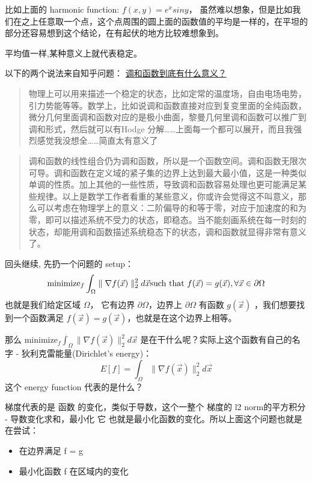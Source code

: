 \documentclass[
]{book}
\providecommand{\tightlist}{%
  \setlength{\itemsep}{0pt}\setlength{\parskip}{0pt}}
\begin{document}
比如上面的 harmonic function: \(f(x,y) = e^x siny\)， 虽然难以想象，但是比如我们在之上任意取一个点，这个点周围的圆上面的函数值的平均是一样的，在平坦的部分还容易想到这个结论，在有起伏的地方比较难想象到。

平均值一样,某种意义上就代表稳定。

以下的两个说法来自知乎问题： \href{https://www.zhihu.com/question/25083195}{调和函数到底有什么意义？}

\begin{quote}
物理上可以用来描述一个稳定的状态，比如定常的温度场，自由电场电势，引力势能等等。数学上，比如说调和函数直接对应到复变里面的全纯函数，微分几何里面调和函数对应的是极小曲面，黎曼几何里调和函数可以推广到调和形式，然后就可以有Hodge 分解\ldots\ldots 上面每一个都可以展开，而且我强烈感觉我没想全\ldots\ldots 简直太有意义了
\end{quote}

\begin{quote}
调和函数的线性组合仍为调和函数，所以是一个函数空间。调和函数无限次可导。调和函数在定义域的紧子集的边界上达到最大最小值，这是一种类似单调的性质。加上其他的一些性质，导致调和函数容易处理也更可能满足某些规律。以上是数学工作者看重的某些意义，你或许会觉得这不叫意义，那么可以考虑在物理学上的意义：二阶偏导的和等于零，对应于加速度的和为零，即可以描述系统不受力的状态，即稳态。当不能刻画系统在每一时刻的状态，却能用调和函数描述系统稳态下的状态，调和函数就显得非常有意义了。
\end{quote}

回头继续, 先扔一个问题的 setup：
\[
\text{minimize}_f \int_\Omega \parallel \nabla f(\vec{x}) \parallel_2^2 d\vec{x} \\
\text{such that } f(\vec{x}) = g(\vec{x}) , \forall \vec{x} \in \partial \Omega
\]
也就是我们给定区域 \(\Omega\)， 它有边界 \(\partial \Omega\)，边界上 \(\partial \Omega\) 有函数 \(g(\vec{x})\) ，我们想要找到一个函数满足 \(f(\vec{x}) = g(\vec{x})\)，也就是在这个边界上相等。

那么 \(\text{minimize}_f \int_\Omega \parallel \nabla f(\vec{x}) \parallel_2^2 d\vec{x}\) 是在干什么呢？实际上这个函数有自己的名字 - 狄利克雷能量(Dirichlet's energy)：
\[
E[f] = \int_\Omega \parallel \nabla f(\vec{x}) \parallel_2^2 d\vec{x}
\]
这个 energy function 代表的是什么？

梯度代表的是 函数 的变化，类似于导数，这个一整个 梯度的 l2 norm的平方积分 - 导数变化求和，最小化 它 也就是最小化函数的变化。所以上面这个问题也就是在尝试：

\begin{itemize}
\tightlist
\item
  在边界满足 f = g
\item
  最小化函数 f 在区域内的变化
\end{itemize}
\end{document}
